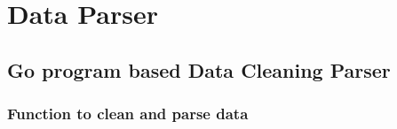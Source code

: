 \chapter{Data Parser} 
\label{AppendixN} 


\section{Go program based Data Cleaning Parser}

\subsection{Function to clean and parse data}
\lstset{basicstyle=\ttfamily\tiny}  
